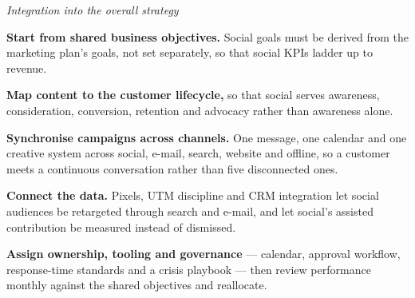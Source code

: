 \begin{qlist}
\textit{Integration into the overall strategy}
\begin{apts}\setcounter{enumi}{7}
\item \textbf{Start from shared business objectives.} Social goals must be
      derived from the marketing plan's goals, not set separately, so that
      social KPIs ladder up to revenue.
\item \textbf{Map content to the customer lifecycle,} so that social serves
      awareness, consideration, conversion, retention and advocacy rather than
      awareness alone.
\item \textbf{Synchronise campaigns across channels.} One message, one calendar
      and one creative system across social, e-mail, search, website and
      offline, so a customer meets a continuous conversation rather than five
      disconnected ones.
\item \textbf{Connect the data.} Pixels, UTM discipline and CRM integration let
      social audiences be retargeted through search and e-mail, and let social's
      assisted contribution be measured instead of dismissed.
\item \textbf{Assign ownership, tooling and governance} --- calendar, approval
      workflow, response-time standards and a crisis playbook --- then review
      performance monthly against the shared objectives and reallocate.
\end{apts}


\end{qlist}
